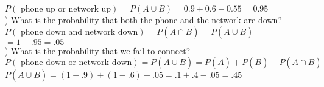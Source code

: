 \documentclass[20pt,landscape]{foils}
\newcommand{\no}{\noindent}
\begin{document}
  $P( \text{ phone up or network up}) =P(A\cup B) = 0.9 + 0.6 - 0.55 = 0.95$\\[.3in]
\no 2)  \no What is the probability that both the phone and the network are down?\\[.2in]
 $P( \text{ phone down and network down})=P(\bar A\cap \bar B) = P(\overline{A\cup B})$\\[.3in]
 \hspace*{3in} $=1-.95=.05$\\[.2in]
 \no 3) What is the probability that we fail to connect?\\[.1in]
  $P( \text{ phone down or network down}) =P(\bar A\cup \bar B)=P(\bar A) + P(\bar B) -P(\bar A\cap \bar B)$\\[.3in]
\hspace*{2in} $P(\bar A\cup \bar B) =(1-.9)+(1-.6)-.05=.1+.4-.05=.45$
\end{document}

